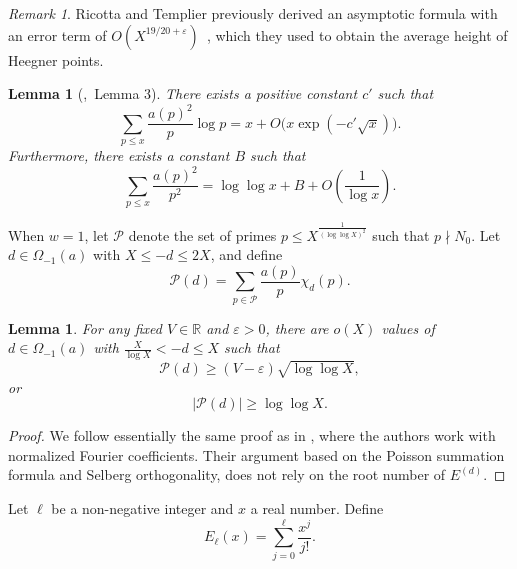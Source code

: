 \documentclass[12pt,reqno]{amsart}
\numberwithin{equation}{section}
\theoremstyle{plain}
\newtheorem{lemma}[theorem]{Lemma}
\theoremstyle{definition}
\theoremstyle{remark}
\newtheorem{remark}[theorem]{Remark}
\begin{document}
\begin{remark}
  Ricotta and Templier previously derived an asymptotic formula with an error term of $O(X^{19/20+\varepsilon})$~\cite{RicottaTemplier2009}, which they used to obtain the average height of Heegner points.
\end{remark}

\begin{lemma}[\cite{RadziwillSoundararajan2015},~Lemma 3]\label{lemma:ortho}
There exists a positive constant \( c' \) such that
\begin{equation*}
  \sum_{p \leq x} \frac{a(p)^2}{p} \log p = x + O\bigl(x \exp(-c' \sqrt{x})\bigr).
\end{equation*}
Furthermore, there exists a constant \( B \) such that
\begin{equation*}
  \sum_{p \leq x} \frac{a(p)^2}{p^2} = \log \log x + B + O\left(\frac{1}{\log x}\right).
\end{equation*}
\end{lemma}

When $w=1$, let \( \mathcal{P} \) denote the set of primes \( p \leq X^{\frac{1}{(\log\log X)^2}} \) such that \( p \nmid N_0 \).
Let \( d \in \Omega_{-1}(a) \) with \( X \leq -d \leq 2X \), and define
\[
\mathcal{P}(d) = \sum_{p \in \mathcal{P}} \frac{a(p)}{p} \chi_d(p).
\]

\begin{lemma}\label{lemma:Pbound}
For any fixed \( V \in \mathbb{R} \) and \( \varepsilon > 0 \), there are \( o(X) \) values of \( d \in \Omega_{-1}(a) \) with \( \frac{X}{\log X} < -d \leq X \) such that
\begin{equation*}
  \mathcal{P}(d) \geq (V - \varepsilon) \sqrt{\log\log X},
\end{equation*}
or
\begin{equation*}
  |\mathcal{P}(d)| \geq \log\log X.
\end{equation*}
\end{lemma}

\begin{proof}
We follow essentially the same proof as in \cite[\S 4]{RadziwillSoundararajan2015}, where the authors work with normalized Fourier coefficients. Their argument based on the Poisson summation formula and Selberg orthogonality, does not rely on the root number of \( E^{(d)} \).
\end{proof}

Let \(\ell\) be a non-negative integer and \(x\) a real number. Define
\[
E_{\ell}(x) = \sum_{j=0}^{\ell} \frac{x^{j}}{j!}.
\]
\end{document}
